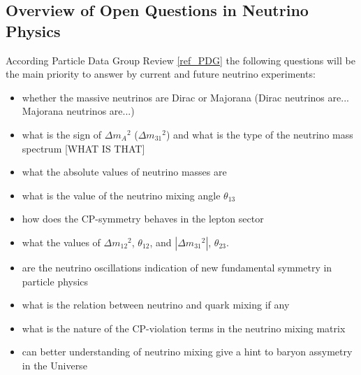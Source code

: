 \subsection{Overview of Open Questions in Neutrino Physics} 
According Particle Data Group Review \ref{ref_PDG} the following questions will be the main priority to answer by current and future neutrino experiments:
\begin{itemize}
  \item whether the massive neutrinos are Dirac or Majorana (Dirac neutrinos are... Majorana neutrinos are...)
  \item what is the sign of $\Delta{m_A}^2$ ($\Delta{m_31}^2$) and what is the type of the neutrino mass spectrum [WHAT IS THAT]
  \item what the absolute values of neutrino masses are
  \item what is the value of the neutrino mixing angle $\theta_{13}$
  \item how does the CP-symmetry behaves in the lepton sector
  \item what the values of $\Delta{m_{12}}^2$, $\theta_{12}$, and $|\Delta{m_{31}}^2|$, $\theta_{23}$.
  \item are the neutrino oscillations indication of new fundamental symmetry in particle physics
  \item what is the relation between neutrino and quark mixing if any
  \item what is the nature of the CP-violation terms in the neutrino mixing matrix
  \item can better understanding of neutrino mixing give a hint to baryon assymetry in the Universe 
\end{itemize} 
